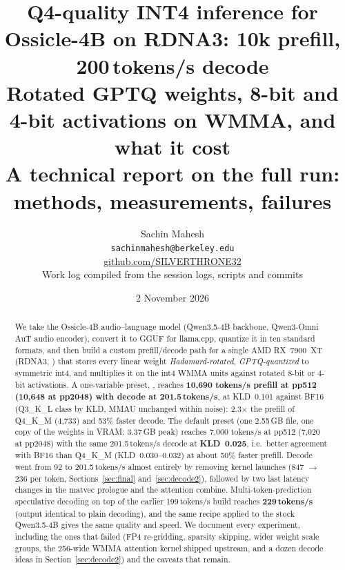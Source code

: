 \documentclass[10pt,a4paper]{article}
\title{\textbf{Q4-quality INT4 inference for Ossicle-4B on RDNA3: 10k prefill, 200\,tokens/s decode}\\[2pt]
\large Rotated GPTQ weights, 8-bit and 4-bit activations on WMMA, and what it cost\\[-2pt]
\normalsize A technical report on the full run: methods, measurements, failures}
\author{Sachin Mahesh\\ \texttt{sachinmahesh@berkeley.edu}\\ \href{https://github.com/SILVERTHRONE32}{github.com/SILVERTHRONE32}\\[3pt]\small Work log compiled from the session logs, scripts and commits}
\date{2 November 2026}
\newcommand{\tx}[1]{\texttt{\detokenize{#1}}}
\begin{document}
\maketitle
\thispagestyle{empty}

\begin{abstract}
\noindent
We take the Ossicle-4B audio--language model (Qwen3.5-4B backbone, Qwen3-Omni AuT audio encoder), convert it to GGUF for
llama.cpp, quantize it in ten standard formats, and then build a custom prefill/decode path for a single AMD RX~7900~XT
(RDNA3, \tx{gfx1100}) that stores every linear weight \emph{Hadamard-rotated}, \emph{GPTQ-quantized} to symmetric int4, and
multiplies it on the int4 WMMA units against rotated 8-bit or 4-bit activations.
A one-variable preset, \tx{GGML_INT4_PREFILL=fast}, reaches \textbf{10{,}690 tokens/s prefill at pp512 (10{,}648 at pp2048) with decode at
201.5\,tokens/s}, at KLD~0.101 against BF16 (Q3\_K\_L class by KLD, MMAU unchanged within noise): 2.3$\times$ the prefill of Q4\_K\_M (4{,}733) and 53\% faster decode.
The default \tx{quality} preset (one 2.55\,GB file, one copy of the weights in VRAM: 3.37\,GB peak) reaches 7{,}000 tokens/s at pp512 (7{,}020 at pp2048) with the same
201.5\,tokens/s decode at \textbf{KLD~0.025}, i.e.\ better agreement with BF16 than Q4\_K\_M (KLD~0.030--0.032) at about 50\% faster prefill.
Decode went from 92 to 201.5\,tokens/s almost entirely by removing kernel launches (847 $\to$ 236 per token, Sections~\ref{sec:final} and~\ref{sec:decode2}), followed
by two last latency changes in the matvec prologue and the attention combine. Multi-token-prediction speculative decoding on top of the
earlier 199\,tokens/s build reaches \textbf{229\,tokens/s} (output identical to plain decoding), and the same recipe applied to the stock Qwen3.5-4B gives
the same quality and speed.
We document every experiment, including the ones that failed (FP4 re-gridding, sparsity skipping, wider weight scale groups, the
256-wide WMMA attention kernel shipped upstream, and a dozen decode ideas in Section~\ref{sec:decode2}) and the caveats that remain.
\end{abstract}
\end{document}

